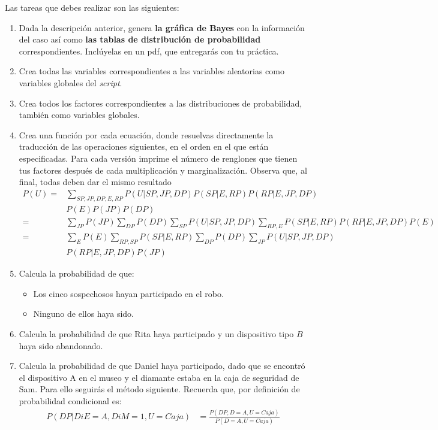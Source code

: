Las tareas que debes realizar son las siguientes:
\begin{enumerate}
 \item Dada la descripción anterior, genera \textbf{la gráfica de Bayes} con la información del caso así como \textbf{las tablas de distribución de probabilidad} correspondientes.  Inclúyelas en un pdf, que entregarás con tu práctica.

 \item Crea todas las variables correspondientes a las variables aleatorias como variables globales del \textit{script}.
 
 \item Crea todos los factores correspondientes a las distribuciones de probabilidad, también como variables globales.
 
 \item Crea una función por cada ecuación, donde resuelvas directamente la traducción de las operaciones siguientes, en el orden en el que están especificadas.  Para cada versión imprime el número de renglones que tienen tus factores después de cada multiplicación y marginalización. Observa que, al final, todas deben dar el mismo resultado
 \begin{align}
  P(U) %
       =& \sum_{SP,JP,DP,E,RP}P(U|SP,JP,DP)P(SP|E,RP)P(RP|E,JP,DP) \\
        & P(E)P(JP)P(DP) \nonumber \\
       =& \sum_{JP}P(JP)\sum_{DP}P(DP)\sum_{SP}P(U|SP,JP,DP)\sum_{RP,E}P(SP|E,RP)P(RP|E,JP,DP)P(E) \nonumber \\
       =& \sum_{E}P(E) \sum_{RP,SP}P(SP|E,RP) \sum_{DP}P(DP) \sum_{JP}P(U|SP,JP,DP) \nonumber \\
        & P(RP|E,JP,DP)P(JP) \nonumber
 \end{align}
 
 \item Calcula la probabilidad de que:
 \begin{itemize}
  \item Los cinco sospechosos hayan participado en el robo.
  \item Ninguno de ellos haya sido.
 \end{itemize}

 \item Calcula la probabilidad de que Rita haya participado y un dispositivo tipo $B$ haya sido abandonado.
 
 \item Calcula la probabilidad de que Daniel haya participado, dado que se encontró el dispositivo A en el museo y el diamante estaba en la caja de seguridad de Sam.  Para ello seguirás el método siguiente.
 Recuerda que, por definición de probabilidad condicional es:
 \begin{align*}
   P(DP|DiE=A,DiM=1,U=Caja) &= \frac{P(DP,D=A,U=Caja)}{P(D=A,U=Caja)}
 \end{align*}
  

\end{enumerate}
